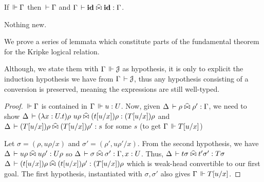 \documentclass[a4paper,english]{lipics-utf8x}
\begin{document}
  \begin{lemma}
    If $\,\Vdash \Gamma$ then $\,\vdash \Gamma$ and $\Gamma \,\vdash \operatorname{\mathbf{id}} \mathrel{\widehat{\bowtie}} \operatorname{\mathbf{id}} : \Gamma$.
  \end{lemma}
  Nothing new.


  We prove a series of lemmata which constitute parts of the fundamental theorem
  for the Kripke logical relation.

  Although, we state them with $\Gamma \,\Vdash \mathcal{J}$ as hypothesis,
  it is only to explicit the induction hypothesis we have from
  $\Gamma \,\vdash \mathcal{J}$, thus any hypothesis consisting of a conversion
  is preserved, meaning the expressions are still well-typed.

  \begin{lemma}
    \leavevmode
    \begin{mathc}
    \end{mathc}
  \end{lemma}

  \begin{proof}
    $\,\Vdash \Gamma$ is contained in $\Gamma \,\Vdash u : U$.
    Now, given $\Delta \,\vdash \rho \mathrel{\widehat{\bowtie}} \rho' : \Gamma$, we need to show
    $\Delta \,\vdash (\lambda x:U.t)\rho\ u\rho \mathrel{\widehat{\bowtie}} (t[u/x])\rho : (T[u/x])\rho$
    and $\Delta \,\vdash (T[u/x])\rho \mathrel{\widehat{\bowtie}} (T[u/x])\rho' : s$ for some $s$
    (to get $\Gamma \,\Vdash T[u/x]$)

    Let $\sigma = (\rho, u \rho/x)$ and $\sigma' = (\rho', u \rho'/x)$.
    From the second hypothesis, we have
    $\Delta \,\vdash u \rho \mathrel{\widehat{\bowtie}} u \rho' : U \rho$
    so $\Delta \,\vdash \sigma \mathrel{\widehat{\bowtie}} \sigma' : \Gamma, x:U$.
    Thus, $\Delta \,\vdash t \sigma \mathrel{\widehat{\bowtie}} t' \sigma' : T\sigma$
    \ie $\Delta \,\vdash (t[u/x])\rho \mathrel{\widehat{\bowtie}} (t[u/x])\rho' : (T[u/x])\rho$
    which is weak-head convertible to our first goal.
    The first hypothesis, instantiated with $\sigma, \sigma'$ also gives
    $\Gamma \,\Vdash T[u/x]$.
  \end{proof}
\end{document}
